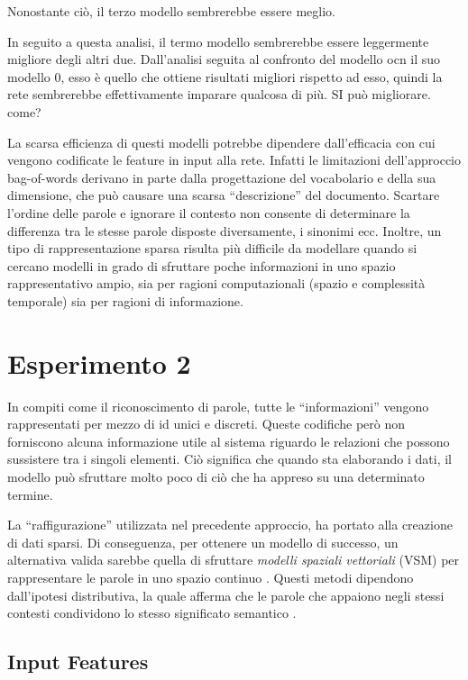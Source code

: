 {\color{red} Nonostante ciò, il terzo modello sembrerebbe essere meglio.

In seguito a questa analisi, il termo modello sembrerebbe essere leggermente migliore degli altri due. 
Dall'analisi seguita al confronto del modello ocn il suo modello 0, esso è quello che ottiene risultati migliori rispetto ad esso, quindi la rete sembrerebbe effettivamente imparare qualcosa di più. SI può migliorare. come?}

La scarsa efficienza di questi modelli potrebbe dipendere dall'efficacia con cui vengono codificate le feature in input alla rete. 
Infatti le limitazioni dell'approccio bag-of-words derivano in parte dalla progettazione del vocabolario e della sua dimensione, che può causare una scarsa ``descrizione'' del documento. 
Scartare l'ordine delle parole e ignorare il contesto non consente di determinare la differenza tra le stesse parole disposte diversamente, i sinonimi ecc.
Inoltre, un tipo di rappresentazione sparsa risulta più difficile da modellare quando si cercano modelli in grado di sfruttare poche informazioni in uno spazio rappresentativo ampio, sia per ragioni computazionali (spazio e complessità temporale) sia per ragioni di informazione.

\section{Esperimento 2}
\label{sec:es2}

In compiti come il riconoscimento di parole, tutte le ``informazioni'' vengono rappresentati per mezzo di id unici e discreti.
Queste codifiche però non forniscono alcuna informazione utile al sistema riguardo le relazioni che possono sussistere tra i singoli elementi. Ciò significa che quando sta elaborando i dati, il modello può sfruttare molto poco di ciò che ha appreso su una determinato termine. 

La ``raffigurazione'' utilizzata nel precedente approccio, ha portato alla creazione di dati sparsi. Di conseguenza, per ottenere un modello di successo, un alternativa valida sarebbe quella di sfruttare \emph{modelli spaziali vettoriali} (VSM) per rappresentare le parole in uno spazio continuo \cite{FIXME}.
Questi metodi dipendono dall'ipotesi distributiva, la quale afferma che le parole che appaiono negli stessi contesti condividono lo stesso significato semantico \cite{FIXME}. 

\subsection{Input Features}
\label{subsec:features2}

